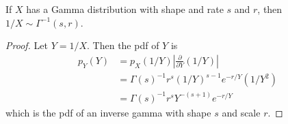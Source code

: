 \begin{lemma}
  If $X$ has a Gamma distribution with shape and rate $s$ and $r$, then $1/X \sim \Gamma^{-1}(s,r)$.
\end{lemma}

\begin{proof}
  Let $Y=1/X$.
  Then the pdf of $Y$ is
  \begin{align*}
    p_Y(Y) 
    &= p_X(1/Y) \left\vert \frac{\partial}{\partial Y} (1/Y) \right\vert \\
    &= \Gamma(s)^{-1} r^s (1/Y)^{s-1} e^{-r/Y} (1/Y^2) \\
    &= \Gamma(s)^{-1} r^s Y^{-(s+1)} e^{-r/Y}
  \end{align*}
  which is the pdf of an inverse gamma with shape $s$ and scale $r$.
\end{proof}



